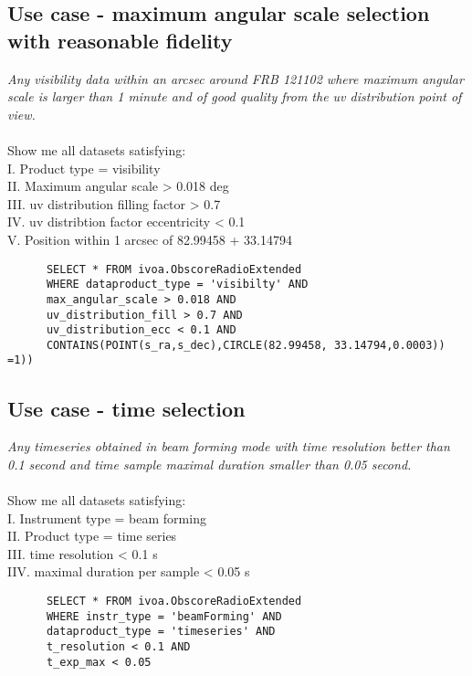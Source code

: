 \subsection{Use case - maximum angular scale selection with reasonable fidelity}
\textit{Any visibility data within an arcsec around FRB 121102 where  maximum angular scale is larger than 1 minute  and 
of good quality from the uv distribution point of view.}\\ \\
Show me all datasets satisfying:\\
I. Product type = visibility \\
II. Maximum angular scale  >  0.018 deg \\
III. uv distribution filling factor  > 0.7 \\
IV. uv distribtion factor eccentricity  < 0.1 \\
V. Position within 1 arcsec of 82.99458 + 33.14794
\begin{verbatim}
      SELECT * FROM ivoa.ObscoreRadioExtended
      WHERE dataproduct_type = 'visibilty' AND
      max_angular_scale > 0.018 AND
      uv_distribution_fill > 0.7 AND
      uv_distribution_ecc < 0.1 AND 
      CONTAINS(POINT(s_ra,s_dec),CIRCLE(82.99458, 33.14794,0.0003)) =1))
\end{verbatim}

\subsection{Use case -  time selection }
\textit{Any timeseries obtained in beam forming mode with time resolution better than 0.1 second and time sample maximal duration smaller than 0.05 second. }\\ \\
Show me all datasets satisfying:\\
I. Instrument type = beam forming\\
II. Product type = time series  \\
III. time resolution < 0.1 s\\
IIV. maximal duration per sample  < 0.05 s \\

\begin{verbatim}
      SELECT * FROM ivoa.ObscoreRadioExtended
      WHERE instr_type = 'beamForming' AND
      dataproduct_type = 'timeseries' AND
      t_resolution < 0.1 AND
      t_exp_max < 0.05 
\end{verbatim}
